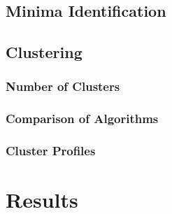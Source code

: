 \documentclass[11pt, a4paper]{article}
\begin{document}
\subsection{Minima Identification}











\subsection{Clustering}








\subsubsection{Number of Clusters}











\subsubsection{Comparison of Algorithms}










\subsubsection{Cluster Profiles}























\pagebreak 
\section{Results}
\end{document}
